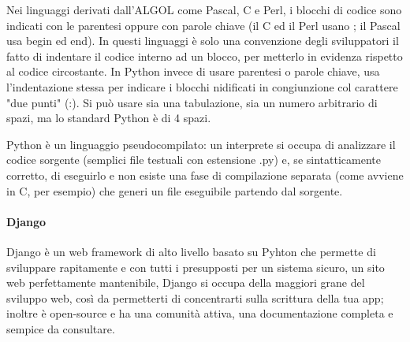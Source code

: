 Nei linguaggi derivati dall'ALGOL come Pascal, C e Perl, i blocchi di codice sono indicati con le parentesi oppure con parole chiave 
(il C ed il Perl usano { }; il Pascal usa begin ed end). In questi linguaggi è solo una convenzione degli sviluppatori il fatto di 
indentare il codice interno ad un blocco, per metterlo in evidenza rispetto al codice circostante. In Python invece di usare parentesi 
o parole chiave, usa l'indentazione stessa per indicare i blocchi nidificati in congiunzione col carattere "due punti" (:). Si può usare 
sia una tabulazione, sia un numero arbitrario di spazi, ma lo standard Python è di 4 spazi. 

Python è un linguaggio pseudocompilato: un interprete si occupa di analizzare il codice sorgente (semplici file testuali con 
estensione .py) e, se sintatticamente corretto, di eseguirlo e non esiste una fase di compilazione separata (come 
avviene in C, per esempio) che generi un file eseguibile partendo dal sorgente. \cite{python-documentation}

\paragraph{Django}
Django è un web framework di alto livello basato su Pyhton che permette di sviluppare rapitamente e con tutti i presupposti per un sistema sicuro, un sito web
perfettamente mantenibile, Django si occupa della maggiori grane del sviluppo web, così da permetterti di concentrarti sulla scrittura della tua app; inoltre 
è open-source e ha una comunità attiva, una documentazione completa e sempice da consultare.


